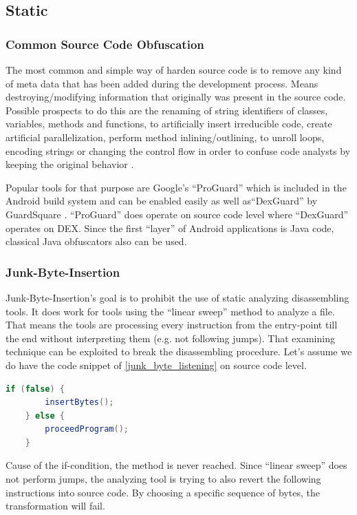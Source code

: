 \subsection{Static}
\subsubsection{Common Source Code Obfuscation}
The most common and simple way of harden source code is to remove any kind of meta data
that has been added during the development process. Means destroying/modifying
information that originally was present in the source code.
Possible prospects to do this are the renaming of string identifiers of
classes, variables, methods and functions, to artificially insert
irreducible code, create artificial parallelization, perform method inlining/outlining, to unroll loops, encoding strings or changing the control flow in
order to confuse code analysts by keeping the original behavior
\parencite{lvl_imp}.

Popular tools for that purpose are Google's ``ProGuard''
\parencite{proguardtool} which is included in the Android build system and
can be enabled easily as well as``DexGuard'' by GuardSquare
\parencite{dexguardtool}. ``ProGuard'' does
operate on source code level where ``DexGuard'' operates on DEX.
Since the first ``layer'' of Android applications is Java code, classical Java
obfuscators also can be used.

\subsubsection{Junk-Byte-Insertion}
Junk-Byte-Insertion's goal is to prohibit the use of static analyzing
disassembling tools. It does work for tools using the
``linear sweep'' method to analyze a file. That means
the tools are processing every instruction from the entry-point
till the end without interpreting them (e.g. not following jumps).
That examining technique can be exploited to break the disassembling
procedure. Let's assume we do have the code snippet of
\autoref{junk_byte_listening}
on source code level.

  \begin{lstlisting}[language=Java, caption=Junk-Byte-Insertion, label=junk_byte_listening]
    if (false) {
        insertBytes();
    } else {
        proceedProgram();
    }
  \end{lstlisting}


Cause of the if-condition, the  method is never
reached. Since ``linear sweep'' does not perform jumps, the analyzing tool
is trying to also revert the following instructions into source code. By choosing a specific sequence of bytes, the transformation will fail.

